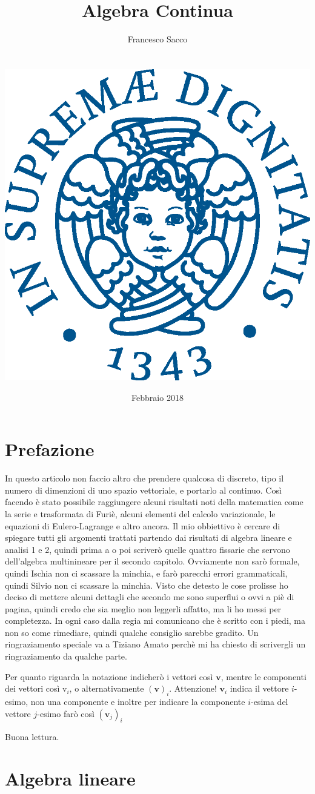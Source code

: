 \documentclass[11pt,a4paper]{report}
\date{{\LARGE Febbraio 2018}}
\title{{\myfont Algebra Continua}}
\author{{\Huge Francesco Sacco}\\ \\ \\
		\includegraphics[scale=0.6]{Immagini/cherubino.eps}\\}
\newcommand{\vettore}[1]{\mathbf{#1}}
\newcommand{\vettorec}[1]{\textrm{#1}}
\theoremstyle{definition}
\theoremstyle{plain}
\theoremstyle{plain}
\begin{document}
	\maketitle
	\tableofcontents
	\chapter*{Prefazione}
		In questo articolo non faccio altro che prendere qualcosa di discreto, tipo il numero di dimenzioni di uno spazio vettoriale, e portarlo al continuo. Così facendo è stato possibile raggiungere alcuni risultati noti della matematica come la serie e trasformata di Furiè, alcuni elementi del calcolo variazionale, le equazioni di Eulero-Lagrange e altro ancora.\newline
		Il mio obbiettivo è cercare di spiegare tutti gli argomenti trattati partendo dai risultati di algebra lineare e analisi 1 e 2, quindi prima a o poi scriverò quelle quattro fissarie che servono dell'algebra multinineare per il secondo capitolo.\newline
		Ovviamente non sarò formale, quindi Ischia non ci scassare la minchia, e farò parecchi errori grammaticali, quindi Silvio non ci scassare la minchia.\newline
		Visto che detesto le cose prolisse ho deciso di mettere alcuni dettagli che secondo me sono superflui o ovvi a piè di pagina, quindi credo che sia meglio non leggerli affatto, ma li ho messi per completezza.\newline
		In ogni caso dalla regia mi comunicano che è scritto con i piedi, ma non so come rimediare, quindi qualche consiglio sarebbe gradito.\newline
		Un ringraziamento speciale va a Tiziano Amato perchè mi ha chiesto di scrivergli un ringraziamento da qualche parte.\newline

		Per quanto riguarda la notazione indicherò i vettori così $\vettore v$, mentre le componenti dei vettori così $\vettorec v_i$, o alternativamente $(\vettore v)_i$. Attenzione! $\vettore v_i$ indica il vettore $i$-esimo, non una componente e inoltre per indicare la componente $i$-esima del vettore $j$-esimo farò così $(\vettore v_j)_i$\newline

		Buona lettura.
	
	\chapter{Algebra lineare}
\end{document}
